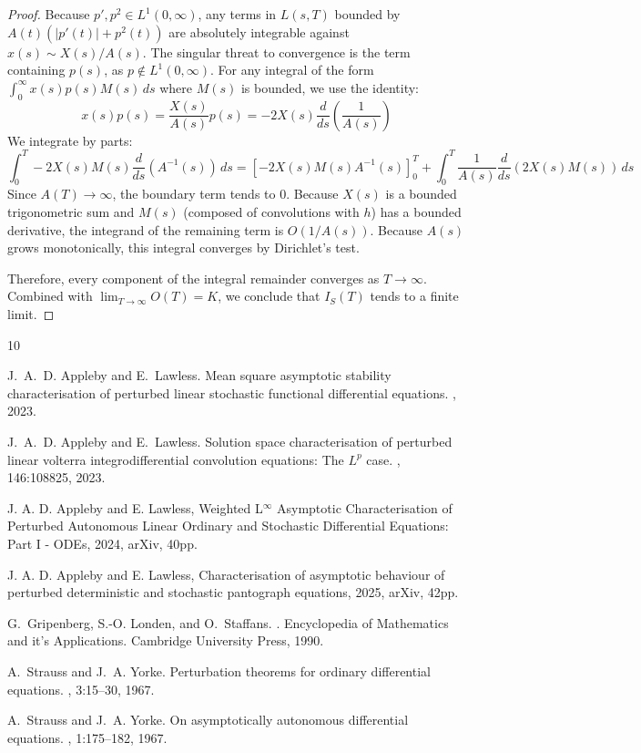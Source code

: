 \documentclass[10pt,reqno]{amsart}
\theoremstyle{definition}
\begin{document}
\begin{proof}
		Because $p', p^2 \in L^1(0,\infty)$, any terms in $L(s,T)$ bounded by $A(t)(|p'(t)| + p^2(t))$ are absolutely integrable against $x(s) \sim X(s)/A(s)$. The singular threat to convergence is the term containing $p(s)$, as $p \notin L^1(0, \infty)$. 
		For any integral of the form $\int_0^\infty x(s) p(s) M(s)\,ds$ where $M(s)$ is bounded, we use the identity:
		\[ x(s)p(s) = \frac{X(s)}{A(s)}p(s) = -2 X(s) \frac{d}{ds}\left(\frac{1}{A(s)}\right) \]
		We integrate by parts:
		\[ \int_0^T -2 X(s) M(s) \frac{d}{ds}(A^{-1}(s))\,ds = \left[ -2 X(s) M(s) A^{-1}(s) \right]_0^T + \int_0^T \frac{1}{A(s)} \frac{d}{ds}(2 X(s) M(s))\,ds \]
		Since $A(T) \to \infty$, the boundary term tends to 0. Because $X(s)$ is a bounded trigonometric sum and $M(s)$ (composed of convolutions with $h$) has a bounded derivative, the integrand of the remaining term is $O(1/A(s))$. Because $A(s)$ grows monotonically, this integral converges by Dirichlet's test.
		
		Therefore, every component of the integral remainder converges as $T \to \infty$. Combined with $\lim_{T\to\infty} O(T) = K$, we conclude that $I_S(T)$ tends to a finite limit. 
	\end{proof}
	
				
	\begin{thebibliography}{10}
		
		J.~A.~D. Appleby and E.~Lawless.
		\newblock Mean square asymptotic stability characterisation of perturbed linear stochastic functional differential equations.
		, 2023.
		
		J.~A.~D. Appleby and E.~Lawless.
		\newblock Solution space characterisation of perturbed linear volterra integrodifferential convolution equations: The ${L}^p$ case.
		, 146:108825, 2023.
		
		J. A. D. Appleby and E. Lawless, Weighted L$^\infty$ Asymptotic Characterisation of Perturbed
		Autonomous Linear Ordinary and Stochastic Differential Equations: Part I - ODEs, 2024,
		arXiv, 40pp.
		
J. A. D. Appleby and E. Lawless, Characterisation of asymptotic behaviour of perturbed deterministic and stochastic pantograph equations, 2025,
arXiv, 42pp.
		
		G.~Gripenberg, S.-O. Londen, and O.~Staffans.
		.
		\newblock Encyclopedia of Mathematics and it's Applications. Cambridge University Press, 1990.
		
		A.~Strauss and J.~A. Yorke.
		\newblock Perturbation theorems for ordinary differential equations.
		, 3:15--30, 1967.
		
		A.~Strauss and J.~A. Yorke.
		\newblock On asymptotically autonomous differential equations.
		, 1:175--182, 1967.
	\end{thebibliography}
	
\end{document}
